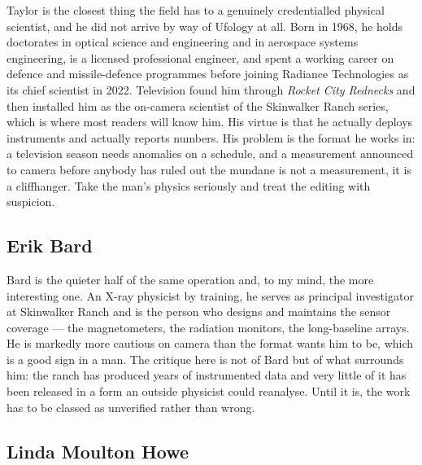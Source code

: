 Taylor is the closest thing the field has to a genuinely credentialled
physical scientist, and he did not arrive by way of Ufology at all. Born in 1968, he holds
doctorates in optical science and engineering and in aerospace systems engineering, is a
licensed professional engineer, and spent a working career on defence and missile-defence
programmes before joining Radiance Technologies as its chief scientist in 2022. Television
found him through \emph{Rocket City Rednecks} and then installed him as the on-camera
scientist of the Skinwalker Ranch series, which is where most readers will know him. His
virtue is that he actually deploys instruments and actually reports numbers. His problem is
the format he works in: a television season needs anomalies on a schedule, and a
measurement announced to camera before anybody has ruled out the mundane is not a
measurement, it is a cliffhanger. Take the man's physics seriously and treat the editing
with suspicion.

\subsection{Erik Bard}

Bard is the quieter half of the same operation and, to my mind, the more
interesting one. An X-ray physicist by training, he serves as principal investigator at
Skinwalker Ranch and is the person who designs and maintains the sensor coverage --- the
magnetometers, the radiation monitors, the long-baseline arrays. He is markedly more
cautious on camera than the format wants him to be, which is a good sign in a man. The
critique here is not of Bard but of what surrounds him: the ranch has produced years of
instrumented data and very little of it has been released in a form an outside physicist
could reanalyse. Until it is, the work has to be classed as unverified rather than wrong.

\subsection{Linda Moulton Howe}

